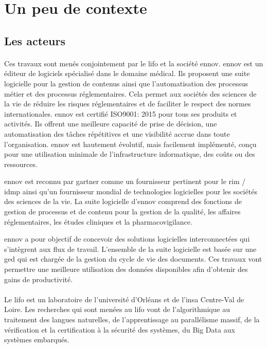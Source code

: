 \section{Un peu de contexte}

\subsection{Les acteurs}
\paragraph{}
Ces travaux sont menés conjointement par le \gls{lifo} et la société \gls{ennov}.
\gls{ennov} est un éditeur de logiciels spécialisé dans le domaine médical.
Ils proposent une suite logicielle pour la gestion de contenus ainsi que l’automatisation des processus métier et des processus réglementaires.
Cela permet aux sociétés des sciences de la vie de réduire les risques réglementaires et de faciliter le respect des normes internationales.
\gls{ennov} est certifié ISO9001: 2015 pour tous ses produits et activités.
Ils offrent une meilleure capacité de prise de décision, une automatisation des tâches répétitives et une visibilité accrue dans toute l'organisation.
\gls{ennov} est hautement évolutif, mais facilement implémenté, conçu pour une utilisation minimale de l'infrastructure informatique, des coûts ou des ressources.

\gls{ennov} est reconnu par \gls{gartner} comme un fournisseur pertinent pour le \gls{rim} / \gls{idmp} ainsi qu'un fournisseur mondial de technologies logicielles pour les sociétés des sciences de la vie.
La suite logicielle d'\gls{ennov} comprend des fonctions de gestion de processus et de contenu pour la gestion de la qualité, les affaires réglementaires, les études cliniques et la pharmacovigilance.

\gls{ennov} a pour objectif de concevoir des solutions logicielles interconnectées qui s'intègrent aux flux de travail.
L'ensemble de la suite logicielle est basée sur une \gls{ged} qui est chargée de la gestion du cycle de vie des documents.
Ces travaux vont permettre une meilleure utilisation des données disponibles afin d'obtenir des gains de productivité.

\paragraph{}
Le \gls{lifo} est un laboratoire de l'université d'Orléans et de l'\gls{insa} Centre-Val de Loire.
Les recherches qui sont menées au \gls{lifo} vont de l'algorithmique au traitement des langues naturelles, de l'apprentissage au parallélisme massif, de la vérification et la certification à la sécurité des systèmes, du Big Data aux systèmes embarqués.

